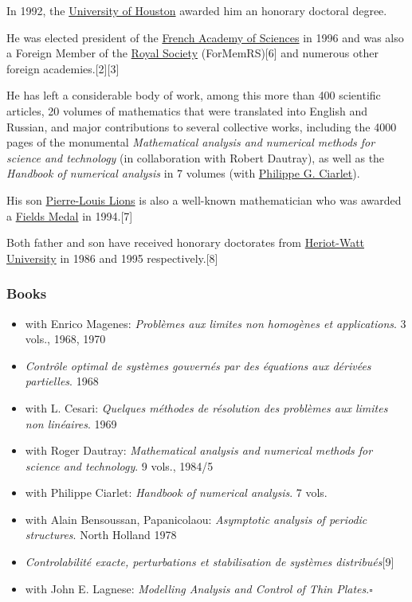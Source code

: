 \documentclass{article}
\begin{document}
In 1992, the \href{https://en.wikipedia.org/wiki/University_of_Houston}{University of Houston} awarded him an honorary doctoral degree.

He was elected president of the \href{https://en.wikipedia.org/wiki/French_Academy_of_Sciences}{French Academy of Sciences} in 1996 and was also a Foreign Member of the \href{https://en.wikipedia.org/wiki/Royal_Society}{Royal Society} (ForMemRS)[6] and numerous other foreign academies.[2][3]

%
He has left a considerable body of work, among this more than 400 scientific articles, 20 volumes of mathematics that were translated into English and Russian, and major contributions to several collective works, including the 4000 pages of the monumental \textit{Mathematical analysis and numerical methods for science and technology} (in collaboration with Robert Dautray), as well as the \textit{Handbook of numerical analysis} in 7 volumes (with \href{https://en.wikipedia.org/wiki/Philippe_G._Ciarlet}{Philippe G. Ciarlet}).

%
His son \href{https://en.wikipedia.org/wiki/Pierre-Louis_Lions}{Pierre-Louis Lions} is also a well-known mathematician who was awarded a \href{https://en.wikipedia.org/wiki/Fields_Medal}{Fields Medal} in 1994.[7]

Both father and son have received honorary doctorates from \href{https://en.wikipedia.org/wiki/Heriot-Watt_University}{Heriot-Watt University} in 1986 and 1995 respectively.[8]

\subsubsection{Books}
\begin{itemize}
	\item with Enrico Magenes: \textit{Problèmes aux limites non homogènes et applications}. 3 vols., 1968, 1970
	\item \textit{Contrôle optimal de systèmes gouvernés par des équations aux dérivées partielles}. 1968
	\item with L. Cesari: \textit{Quelques méthodes de résolution des problèmes aux limites non linéaires}. 1969
	\item with Roger Dautray: \textit{Mathematical analysis and numerical methods for science and technology}. 9 vols., 1984/5
	\item with Philippe Ciarlet: \textit{Handbook of numerical analysis}. 7 vols.
	\item with Alain Bensoussan, Papanicolaou: \textit{Asymptotic analysis of periodic structures}. North Holland 1978
	\item \textit{Controlabilité exacte, perturbations et stabilisation de systèmes distribués}[9]
	\item with John E. Lagnese: \textit{Modelling Analysis and Control of Thin Plates}.\hfill$\square$
\end{itemize}
\end{document}
